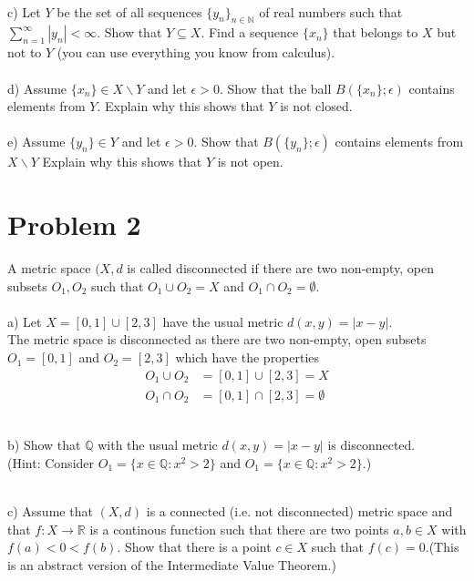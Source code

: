 \documentclass[12pt,letterpaper]{article}
\begin{document}
 
 \noindent \\
 c)  Let $Y$ be the set of all sequences $ \{y_n\}_{n\in\mathbb{N}}$ of real numbers such that $\sum_{n=1}^{\infty} |y_n| < \infty$. Show that $Y \subseteq X$. Find a sequence $\{x_n\}$ that belongs to $X$ but not to $Y$ (you can use everything you know from calculus).\\
 
 
 
 \noindent \\
d) Assume $\{x_n\} \in X \backslash Y$ and let $\epsilon > 0$. Show that the ball $B(\{x_n\}; \epsilon)$ contains elements from $Y$. Explain why this shows that  $Y$ is not closed.\\
 
 
 
 
 \noindent \\
e) Assume $\{y_n\}\in Y$ and let $\epsilon >0$. Show that $B(\{y_n\};\epsilon)$ contains elements from $X \backslash Y$ Explain why this shows that $Y$ is not open. \\
 


 
 
\section*{Problem 2}

A metric space $(X,d$ is called disconnected if there are two non-empty, open subsets $O_1, O_2$ such that $O_1 \cup O_2 = X$ and $O_1 \cap O_2 = \emptyset$. \\
\noindent \\
a) Let $X = [0,1] \cup [2,3]$ have the usual metric $d(x,y) = |x-y|$. \\
The metric space is disconnected as there are two non-empty, open subsets $O_1 = [0,1]$ and $O_2 = [2,3]$ which have the properties 
\begin{align*}
	O_1 \cup O_2  &= [0,1] \cup [2,3] = X \\
	O_1 \cap O_2  &= [0,1] \cap [2,3]  = \emptyset
\end{align*}



\noindent \\
b) Show that $\mathbb{Q}$ with the usual metric $d(x,y)=|x-y|$ is disconnected. \\
(Hint: Consider $O_1=\{x\in\mathbb{Q} : x^2 > 2\}$ and $O_1=\{x\in\mathbb{Q} : x^2 > 2\}$.)




\noindent \\
c) Assume that $(X,d)$ is a connected (i.e. not disconnected) metric space and that $f : X \to \mathbb{R}$ is a continous function such that there are two points $a,b \in X$ with $f(a)<0<f(b)$. Show that there is a point $c\in X$ such that $f(c)=0$.(This is an abstract version of the Intermediate Value Theorem.)
\end{document}
